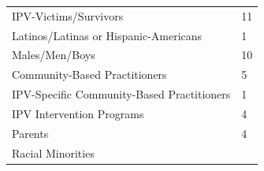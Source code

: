 \documentclass[]{tufte-handout}
\begin{document}
\begin{longtable}[]{@{}ll@{}}
\begin{minipage}[t]{0.59\columnwidth}
IPV-Victims/Survivors\strut
\end{minipage} & \begin{minipage}[t]{0.21\columnwidth}\raggedright\strut
11\strut
\end{minipage}\tabularnewline
\begin{minipage}[t]{0.59\columnwidth}\raggedright\strut
Latinos/Latinas or Hispanic-Americans\strut
\end{minipage} & \begin{minipage}[t]{0.21\columnwidth}\raggedright\strut
1\strut
\end{minipage}\tabularnewline
\begin{minipage}[t]{0.59\columnwidth}\raggedright\strut
Males/Men/Boys\strut
\end{minipage} & \begin{minipage}[t]{0.21\columnwidth}\raggedright\strut
10\strut
\end{minipage}\tabularnewline
\begin{minipage}[t]{0.59\columnwidth}\raggedright\strut
Community-Based Practitioners\strut
\end{minipage} & \begin{minipage}[t]{0.21\columnwidth}\raggedright\strut
5\strut
\end{minipage}\tabularnewline
\begin{minipage}[t]{0.59\columnwidth}\raggedright\strut
IPV-Specific Community-Based Practitioners\strut
\end{minipage} & \begin{minipage}[t]{0.21\columnwidth}\raggedright\strut
1\strut
\end{minipage}\tabularnewline
\begin{minipage}[t]{0.59\columnwidth}\raggedright\strut
IPV Intervention Programs\strut
\end{minipage} & \begin{minipage}[t]{0.21\columnwidth}\raggedright\strut
4\strut
\end{minipage}\tabularnewline
\begin{minipage}[t]{0.59\columnwidth}\raggedright\strut
Parents\strut
\end{minipage} & \begin{minipage}[t]{0.21\columnwidth}\raggedright\strut
4\strut
\end{minipage}\tabularnewline
\begin{minipage}[t]{0.59\columnwidth}\raggedright\strut
Racial Minorities\strut
\end{minipage} & \begin{minipage}[t]{0.21\columnwidth}\raggedright\strut

\end{minipage}
\end{longtable}
\end{document}

